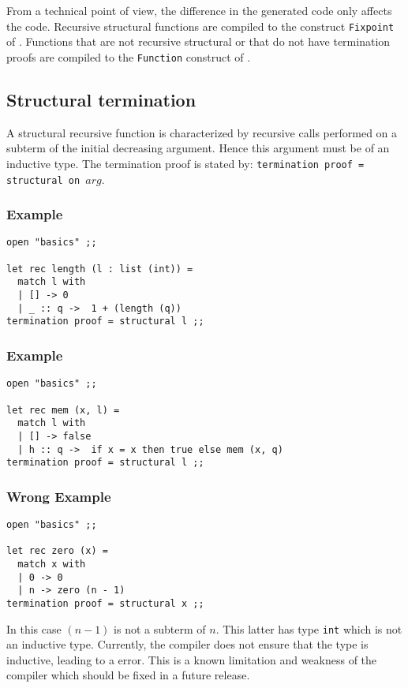 From a technical point of view, the difference in the generated code only
affects the {\coq} code. Recursive structural functions are compiled to the
construct {\tt Fixpoint} of {\coq}. Functions that are not recursive
structural or that do not have termination proofs are compiled to the
{\tt Function} construct of {\coq}.


\subsection{Structural termination}
A structural recursive function is characterized by recursive calls performed
on a subterm of the initial decreasing argument. Hence this argument must be of
an inductive type. The termination proof is stated by:
{\tt termination proof = structural on $arg$}.

\subsubsection{Example}
{\scriptsize
\begin{lstlisting}
open "basics" ;;

let rec length (l : list (int)) =
  match l with
  | [] -> 0
  | _ :: q ->  1 + (length (q))
termination proof = structural l ;;
\end{lstlisting}
}

\subsubsection{Example}
{\scriptsize
\begin{lstlisting}
open "basics" ;;

let rec mem (x, l) =
  match l with
  | [] -> false
  | h :: q ->  if x = x then true else mem (x, q)
termination proof = structural l ;;
\end{lstlisting}
}

\subsubsection{{\bf Wrong} Example}
{\scriptsize
\begin{lstlisting}
open "basics" ;;

let rec zero (x) =
  match x with
  | 0 -> 0
  | n -> zero (n - 1)
termination proof = structural x ;;
\end{lstlisting}
}

In this case $(n - 1)$ is not a subterm of $n$. This latter has type
{\tt int} which is not an inductive type. Currently, the compiler does not
ensure that the type is inductive, leading to a {\coq} error. This is a
known limitation and weakness of the compiler which should be fixed in a
future release.

